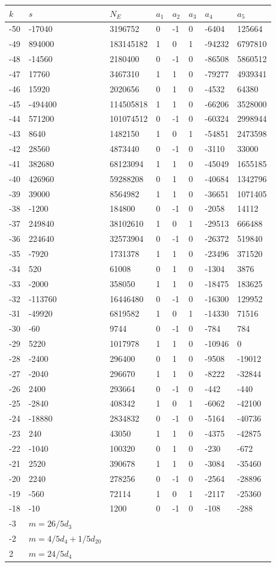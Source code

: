 \documentclass{amsart}
\begin{document}
\begin{longtable}{|l|l|l|lllll|}
\hline
$k$ & $s$ & $N_E$ & $a_1$ & $a_2$ & $a_3$ & $a_4$ & $a_5$\\
\hline
-50&-17040&3196752&0&-1&0&-6404&125664\\
-49&894000&183145182&1&0&1&-94232&6797810\\
-48&-14560&2180400&0&-1&0&-86508&5860512\\
-47&17760&3467310&1&1&0&-79277&4939341\\
-46&15920&2020656&0&1&0&-4532&64380\\
-45&-494400&114505818&1&1&0&-66206&3528000\\
-44&571200&101074512&0&-1&0&-60324&2998944\\
-43&8640&1482150&1&0&1&-54851&2473598\\
-42&28560&4873440&0&-1&0&-3110&33000\\
-41&382680&68123094&1&1&0&-45049&1655185\\
-40&426960&59288208&0&1&0&-40684&1342796\\
-39&39000&8564982&1&1&0&-36651&1071405\\
-38&-1200&184800&0&-1&0&-2058&14112\\
-37&249840&38102610&1&0&1&-29513&666488\\
-36&224640&32573904&0&-1&0&-26372&519840\\
-35&-7920&1731378&1&1&0&-23496&371520\\
-34&520&61008&0&1&0&-1304&3876\\
-33&-2000&358050&1&1&0&-18475&183625\\
-32&-113760&16446480&0&-1&0&-16300&129952\\
-31&-49920&6819582&1&0&1&-14330&71516\\
-30&-60&9744&0&-1&0&-784&784\\
-29&5220&1017978&1&1&0&-10946&0\\
-28&-2400&296400&0&1&0&-9508&-19012\\
-27&-2040&296670&1&1&0&-8222&-32844\\
-26&2400&293664&0&-1&0&-442&-440\\
-25&-2840&408342&1&0&1&-6062&-42100\\
-24&-18880&2834832&0&-1&0&-5164&-40736\\
-23&240&43050&1&1&0&-4375&-42875\\
-22&-1040&100320&0&1&0&-230&-672\\
-21&2520&390678&1&1&0&-3084&-35460\\
-20&2240&278256&0&-1&0&-2564&-28896\\
-19&-560&72114&1&0&1&-2117&-25360\\
-18&-10&1200&0&-1&0&-108&-288\\
-3&$m=26/5d_{3}$&&\multicolumn{5}{c|}{}\\
-2&$m=4/5d_{4}+1/5d_{20}$&&\multicolumn{5}{c|}{}\\
2&$m=24/5d_{4}$&&\multicolumn{5}{c|}{}\\
\hline
\end{longtable}
\end{document}
